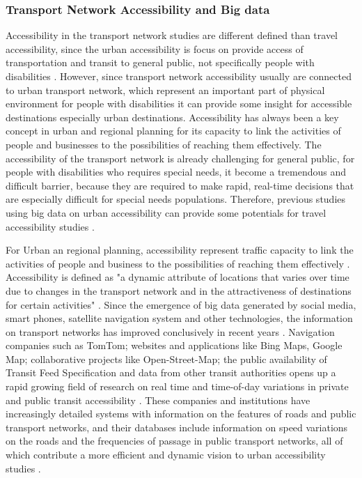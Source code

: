 \subsubsection{Transport Network Accessibility and Big data}
Accessibility in the transport network studies are different defined than travel 
accessibility, since the urban accessibility is focus on provide access of 
transportation and transit to general public, not specifically people with 
disabilities \cite{moya2016dynamic}. However, since transport network accessibility 
usually are connected to urban transport network, which represent an important 
part of physical environment for people with disabilities it can provide some insight for 
accessible destinations especially urban destinations. Accessibility has always been a key 
concept in urban and regional planning for its capacity to link the activities 
of people and businesses to the possibilities of reaching them effectively. 
The accessibility of the transport network is already challenging for general 
public, for people with disabilities who requires special needs, it become a 
tremendous and difficult barrier, because they are required to make rapid, 
real-time decisions that are especially difficult for special needs populations. 
Therefore, previous studies using big data on urban accessibility can provide 
some potentials for travel accessibility studies \cite{Barbeau}.

For Urban an regional planning, accessibility represent traffic capacity to link the 
activities of people and business to the possibilities of reaching them effectively 
\cite{moya2016dynamic}. Accessibility is defined as "a dynamic attribute of locations
that varies over time due to changes in the transport network and in the attractiveness 
of destinations for certain activities" \cite{moya2016dynamic}. Since the emergence of
big data generated by social media, smart phones, satellite navigation system and other 
technologies,  the information on transport networks has improved conclusively in recent 
years \cite{Barbeau}. Navigation companies such as TomTom; websites and applications 
like Bing Maps, Google Map; collaborative projects like Open-Street-Map; the public 
availability of Transit Feed Specification and data from other transit authorities 
opens up a rapid growing field of research on real time and time-of-day variations 
in private and public transit accessibility \cite{moya2016dynamic}. These companies 
and institutions have increasingly detailed systems with information on the features 
of roads and public transport networks, and their databases include information on 
speed variations on the roads and the frequencies of passage in public transport
networks, all of which contribute a more efficient and dynamic vision to urban 
accessibility studies \cite{moya2016dynamic}.

